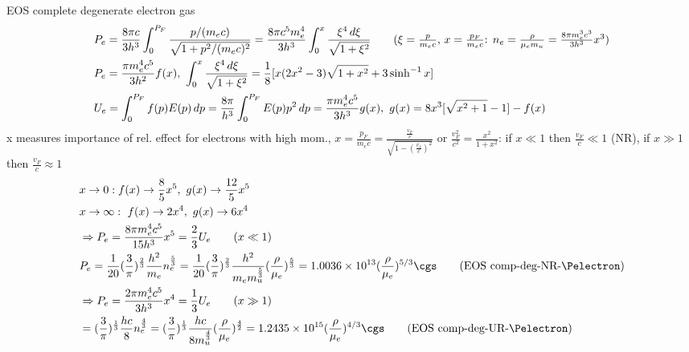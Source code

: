 \begin{frame}{EOS complete degenerate electron gas}
\begin{align*}
    &P_e=\frac{8\pi c}{3h^3}\int_0^{P_F}\frac{p/(m_ec)}{\sqrt{1+p^2/(m_ec)^2}}=\frac{8\pi c^5 m_e^4}{3h^3}\int_0^x \frac{\xi^4\,d\xi}{\sqrt{1+\xi^2}}\tag{$\xi=\frac{p}{m_ec}$, $x=\frac{p_F}{m_ec}$: $n_e=\frac{\rho}{\mu_em_u}=\frac{8\pi m_e^3c^3}{3h^3}x^3$}\\
    &P_e=\frac{\pi m_e^4c^5}{3h^2}f(x),\ \int_0^x \frac{\xi^4\,d\xi}{\sqrt{1+\xi^2}}=\frac{1}{8}[x(2x^2-3)\sqrt{1+x^2}+3\sinh^{-1}{x}]\\
    &U_e=\int_0^{P_F}f(p)E(p)\,dp=\frac{8\pi}{h^3}\int_0^{P_F}E(p)p^2\,dp=\frac{\pi m_e^4c^5}{3h^3}g(x),\ g(x)=8x^3[\sqrt{x^2+1}-1]-f(x)\\
\end{align*}
x measures importance of rel. effect for electrons with high mom., $x=\frac{p_F}{m_ec}=\frac{\frac{v_F}{c}}{\sqrt{1-(\frac{v_f}{c})^2}}$ or $\frac{v_F^2}{c^2}=\frac{x^2}{1+x^2}$: if $x\ll1$ then $\frac{v_F}{c}\ll1$ (NR), if $x\gg1$ then $\frac{v_F}{c}\approx1$
\begin{align*}
    &x\to0: f(x)\to \frac{8}{5}x^5,\ g(x)\to \frac{12}{5}x^5\\
    &x\to\infty:\ f(x)\to 2x^4,\ g(x)\to6x^4\\
    &\Rightarrow P_e=\frac{8\pi m_e^4c^5}{15h^3}x^5=\frac{2}{3}U_e\tag{$x\ll1$}\\
    &P_e=\frac{1}{20}(\frac{3}{\pi})^{\frac{2}{3}}\frac{h^2}{m_e}n_e^{\frac{5}{3}}=\frac{1}{20}(\frac{3}{\pi})^{\frac{2}{3}}\frac{h^2}{m_em_u^{\frac{5}{3}}}(\frac{\rho}{\mu_e})^{\frac{5}{3}}=\num{1.0036e13}(\frac{\rho}{\mu_e})\expy{5/3}\si{\cgs}\tag{EOS comp-deg-NR-\Pelectron}\\
    &\Rightarrow P_e=\frac{2\pi m_e^4c^5}{3h^3}x^4=\frac{1}{3}U_e\tag{$x\gg1$}\\
    &=(\frac{3}{\pi})^{\frac{1}{3}}\frac{hc}{8}n_e^{\frac{4}{3}}=(\frac{3}{\pi})^{\frac{1}{3}}\frac{hc}{8m_u^{\frac{4}{3}}}(\frac{\rho}{\mu_e})^{\frac{4}{2}}=\num{1.2435e15}(\frac{\rho}{\mu_e})\expy{4/3}\si{\cgs}\tag{EOS comp-deg-UR-\Pelectron}
\end{align*}
\end{frame}

